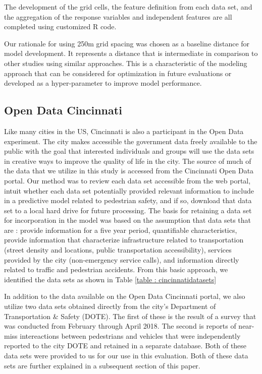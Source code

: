 \documentclass{llncs}
\begin{document}
The development of the grid cells, the feature definition from each data set, and the aggregation of the response variables and independent features are all completed using customized R code.

Our rationale for using 250m grid spacing was chosen as a baseline distance for model development. It represents a distance that is intermediate in comparison to other studies using similar approaches. This is a characteristic of the modeling approach that can be considered for optimization in future evaluations or developed as a hyper-parameter to improve model performance.


\subsection{Open Data Cincinnati}

Like many cities in the US, Cincinnati is also a participant in the Open Data experiment. The city makes accessible the government data freely available to the public with the goal that interested individuals and groups will use the data sets in creative ways to improve the quality of life in the city. The source of much of the data that we utilize in this study is accessed from the Cincinnati Open Data portal. Our method was to review each data set accessible from the web portal, intuit whether each data set potentially provided relevant information to include in a predictive model related to pedestrian safety, and if so, download that data set to a local hard drive for future processing. The basis for retaining a data set for incorporation in the model was based on the assumption that data sets that are : provide information for a five year period, quantifiable characteristics, provide information that characterize infrastructure related to transportation (street density and locations, public transportation accessibility), services provided by the city (non-emergency service calls), and information directly related to traffic and pedestrian accidents. From this basic approach, we identified the data sets as shown in Table \ref{table : cincinnatidatasets}


In addition to the data available on the Open Data Cincinnati portal, we also utilize two data sets obtained directly from the city's Department of Transportation \& Safety (DOTE). The first of these is the result of a survey that was conducted from February through April 2018. The second is reports of near-miss intereactions between pedestrians and vehicles that were independently reported to the city DOTE and retained in a separate database. Both of these data sets were provided to us for our use in this evaluation. Both of these data sets are further explained in a subsequent section of this paper.
\end{document}

